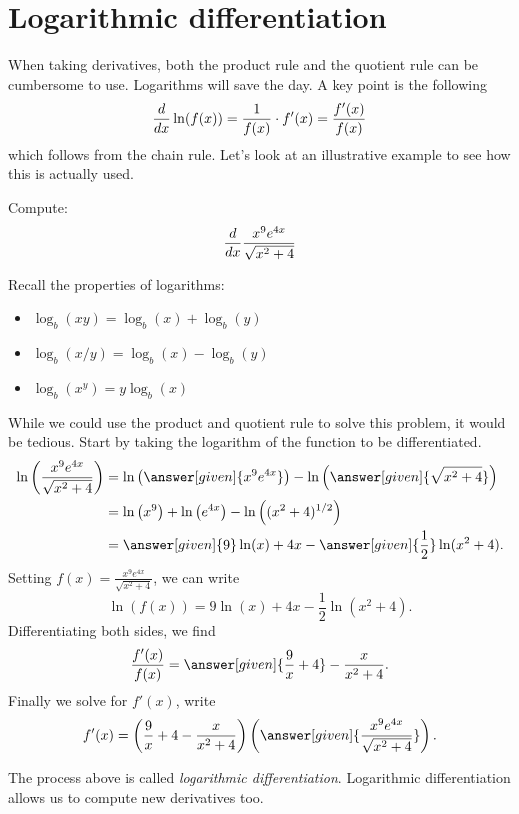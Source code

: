 \documentclass{ximera}
\begin{document}
\section{Logarithmic differentiation}


When taking derivatives, both the product rule and the quotient rule
can be cumbersome to use. Logarithms will save the day. A key point is
the following
\[
\frac{d}{dx} \ln(f(x)) = \frac{1}{f(x)}\cdot f'(x) = \frac{f'(x)}{f(x)}
\]
which follows from the chain rule. Let's look at an illustrative
example to see how this is actually used.

\begin{example} 
Compute:
\[
\frac{d}{dx} \frac{x^9e^{4x}}{\sqrt{x^2+4}}
\]

Recall the properties of logarithms:
\begin{itemize}
\item $\log_b(xy) = \log_b(x) + \log_b(y)$
\item $\log_b(x/y) = \log_b(x) - \log_b(y)$
\item $\log_b(x^y) = y\log_b(x)$
\end{itemize}

While we could use the product and quotient rule to solve this
problem, it would be tedious. Start by taking the logarithm of the
function to be differentiated.
\begin{align*}
\ln\left(\frac{x^9e^{4x}}{\sqrt{x^2+4}} \right) &= \ln\left(\answer[given]{x^9e^{4x}}\right) - \ln\left(\answer[given]{\sqrt{x^2+4}}\right)\\
&= \ln\left(x^9\right)+\ln\left(e^{4x}\right) - \ln\left((x^2+4)^{1/2}\right)\\
&= \answer[given]{9}\ln(x)+4x - \answer[given]{\frac{1}{2}}\ln(x^2+4).
\end{align*}
Setting $f(x) = \frac{x^9e^{4x}}{\sqrt{x^2+4}}$, we can write
\[
\ln(f(x)) = 9\ln(x)+4x - \frac{1}{2}\ln(x^2+4).
\]
Differentiating both sides, we find
\[
\frac{f'(x)}{f(x)} = \answer[given]{\frac{9}{x}+4} - \frac{x}{x^2+4}.
\]
Finally we solve for $f'(x)$, write
\[
f'(x) = \left(\frac{9}{x}+4 - \frac{x}{x^2+4}\right)\left(\answer[given]{\frac{x^9e^{4x}}{\sqrt{x^2+4}}}\right).
\]
\end{example}

The process above is called \textit{logarithmic
  differentiation}. Logarithmic differentiation allows us to compute
new derivatives too.
\end{document}
